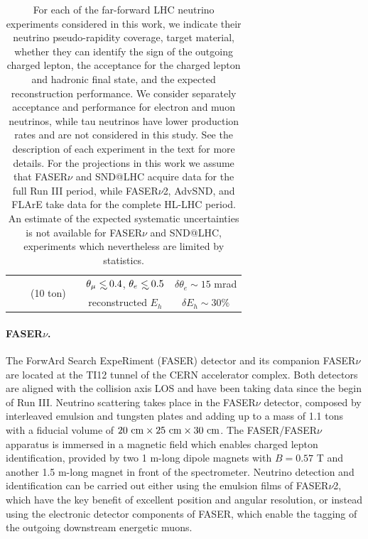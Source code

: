 \begin{table}[t]
\begin{tabularx}{\textwidth}{Xccccc}
&   &  \multirow{2}{*}{(10 ton)}   &   & $\theta_\mu \lsim 0.4$, $\theta_e \lsim 0.5$ &    $\delta \theta_e \sim 15 $ mrad   \\
 &   &     &  & reconstructed $E_h$  &    $\delta E_h \sim 30\% $   \\
  \bottomrule
\end{tabularx}
\vspace{0.2cm}
\caption{\small For each of the far-forward LHC neutrino experiments considered
  in this work, we indicate their neutrino pseudo-rapidity coverage, target material, whether
  they can identify the sign of the outgoing charged lepton,
  the acceptance for the charged lepton and hadronic final state,
  and the expected reconstruction performance.
  We consider separately acceptance and performance for electron and muon
  neutrinos, while tau neutrinos have lower production rates and are not considered in this study.
  See the description of each experiment in the text for more details.
  For the projections in this work we assume that FASER$\nu$ and SND@LHC acquire data
  for the full Run III period, while FASER$\nu$2, AdvSND, and FLArE take data
  for the complete HL-LHC period.
  An estimate of the expected 
  systematic uncertainties is not available for FASER$\nu$ and SND@LHC, experiments
  which nevertheless are limited by statistics.
  \label{tab:FPF_experiments}
}
\end{table}

\paragraph{FASER$\nu$.}
%
The ForwArd Search ExpeRiment (FASER) detector and its companion FASER$\nu$
are located at the TI12 tunnel of the CERN accelerator complex.
%
Both detectors are aligned
with the collision axis LOS  and have been taking data since the begin of Run III.
%
Neutrino scattering takes place in the FASER$\nu$
detector, composed by interleaved emulsion and tungsten plates and
adding up to a mass of 1.1 tons with a fiducial volume of $20~\rm{cm} \times 25~\rm{cm} \times 30~{\rm cm}$.
%
The FASER/FASER$\nu$ apparatus is immersed in a magnetic field which enables charged lepton
identification, provided by two 1 m-long dipole magnets with $B=0.57$ T
and another 1.5 m-long magnet in front of the spectrometer. 
%
Neutrino detection and identification can be carried out either using the emulsion
films of FASER$\nu$2, which have the key benefit of excellent position and angular resolution,
or instead using the electronic detector components of FASER, which enable the tagging
of the outgoing downstream energetic muons. 

